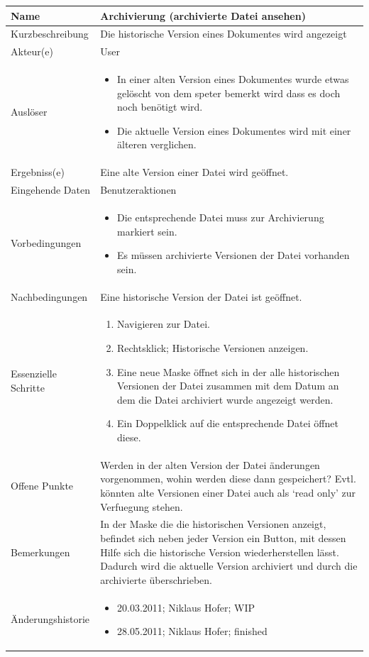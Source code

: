 \documentclass[10pt,paper=a4,final]{scrartcl}
\begin{document}
\begin{tabularx}{\textwidth}{|l|X|}
\hline
\bf Name		& {\bf Archivierung (archivierte Datei ansehen)} \\ \hline
Kurzbeschreibung	& Die historische Version eines Dokumentes wird angezeigt \\ \hline
Akteur(e)		& User \\ \hline
Ausl\"oser		& \begin{itemize}
  \item In einer alten Version eines Dokumentes wurde etwas gelöscht von dem speter bemerkt wird dass es doch noch benötigt wird.
  \item Die aktuelle Version eines Dokumentes wird mit einer älteren verglichen. \end{itemize} \\ \hline
Ergebniss(e)		& Eine alte Version einer Datei wird geöffnet. \\ \hline
Eingehende Daten	& Benutzeraktionen \\ \hline
Vorbedingungen		& \begin{itemize}
  \item Die entsprechende Datei muss zur Archivierung markiert sein.
  \item Es müssen archivierte Versionen der Datei vorhanden sein. \end{itemize} \\ \hline
Nachbedingungen		& Eine historische Version der Datei ist geöffnet. \\ \hline
Essenzielle Schritte	& \begin{enumerate}
  \item Navigieren zur Datei.
  \item Rechtsklick; Historische Versionen anzeigen.
  \item Eine neue Maske öffnet sich in der alle historischen Versionen der Datei zusammen mit dem Datum an dem die Datei archiviert wurde angezeigt werden.
  \item Ein Doppelklick auf die entsprechende Datei öffnet diese. \end{enumerate} \\ \hline
Offene Punkte		& Werden in der alten Version der Datei änderungen vorgenommen, wohin werden diese dann gespeichert?
Evtl. könnten alte Versionen einer Datei auch als ‘read only’ zur Verfuegung stehen. \\ \hline
Bemerkungen		& In der Maske die die historischen Versionen anzeigt, befindet sich neben jeder Version ein Button, mit dessen Hilfe sich die historische Version wiederherstellen lässt.
Dadurch wird die aktuelle Version archiviert und durch die archivierte überschrieben. \\ \hline
\"Anderungshistorie	& \begin{itemize}
  \item 20.03.2011; Niklaus Hofer; WIP
  \item 28.05.2011; Niklaus Hofer; finished \end{itemize} \\ \hline
\end{tabularx}
\end{document}
